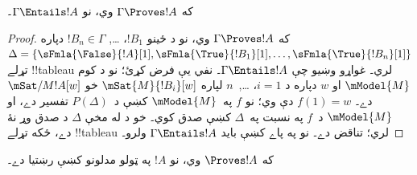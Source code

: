 \documentclass[../../../include/open-logic-section]{subfiles}
\begin{document}
\begin{cor}
که $\Gamma \Proves !A$ وي، نو $\Gamma \Entails !A$۔
\end{cor}

\begin{proof}
  که $\Gamma \Proves !A$ وي، نو د ځينو $!B_1$، \dots,
  $!B_n \in \Gamma$ دپاره
  $\Delta = \{\sFmla{\False}{!A}[1], \sFmla{\True}{!B_1}[1],
  \dots, \sFmla{\True}{!B_n}[1]\}$ تړلے !!{tableau} لري۔
  غواړو وښيو چې $\Gamma \Entails !A$۔ نفي يې فرض کړئ؛ نو
  د کوم $\mModel{M}$ او $w$ دپاره د $i=1$، \dots,~$n$
  لپاره $\mSat{M}{!B_i}[w]$ خو $\mSat/{M}{!A}[w]$ دے۔
  $f(1) = w$ دې وي؛ نو $f$ په~$\mModel{M}$ کښې د~$P(\Delta)$
  تفسير دے، او $\mModel{M}$ د~$f$ په نسبت په~$\Delta$ کښې
  صدق کوي۔ خو د  له مخې
  $\Delta$ د صدق وړ نۀ دے، ځکه تړلے !!{tableau} لري؛ تناقض
  دے۔ نو په پاے کښې بايد $\Gamma \Entails !A$ ولرو۔
\end{proof}

\begin{cor}
که $\Proves !A$ وي، نو $!A$ په ټولو مدلونو کښې رښتيا دے۔
\end{cor}
\end{document}
